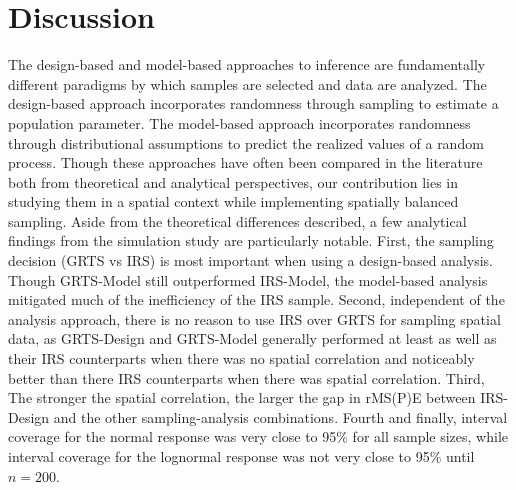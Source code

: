 \documentclass[]{elsarticle} %
\begin{document}
\hypertarget{sec:discussion}{%
\section{Discussion}\label{sec:discussion}}

The design-based and model-based approaches to inference are
fundamentally different paradigms by which samples are selected and data
are analyzed. The design-based approach incorporates randomness through
sampling to estimate a population parameter. The model-based approach
incorporates randomness through distributional assumptions to predict
the realized values of a random process. Though these approaches have
often been compared in the literature both from theoretical and
analytical perspectives, our contribution lies in studying them in a
spatial context while implementing spatially balanced sampling. Aside
from the theoretical differences described, a few analytical findings
from the simulation study are particularly notable. First, the sampling
decision (GRTS vs IRS) is most important when using a design-based
analysis. Though GRTS-Model still outperformed IRS-Model, the
model-based analysis mitigated much of the inefficiency of the IRS
sample. Second, independent of the analysis approach, there is no reason
to use IRS over GRTS for sampling spatial data, as GRTS-Design and
GRTS-Model generally performed at least as well as their IRS
counterparts when there was no spatial correlation and noticeably better
than there IRS counterparts when there was spatial correlation. Third,
The stronger the spatial correlation, the larger the gap in rMS(P)E
between IRS-Design and the other sampling-analysis combinations. Fourth
and finally, interval coverage for the normal response was very close to
95\% for all sample sizes, while interval coverage for the lognormal
response was not very close to 95\% until \(n = 200\).
\end{document}
